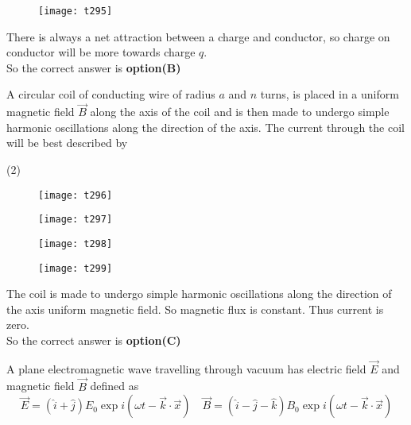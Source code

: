 \begin{questions}
\begin{tasks}
\begin{figure}[H]
	\end{figure}
	\task[\textbf{D.}] \begin{figure}[H]
		\centering
		\texttt{[image: t295]}
	\end{figure}
\end{tasks}
\begin{answer}
	There is always a net attraction between a charge and conductor, so charge on conductor will be more towards charge $q$.\\
	So the correct answer is \textbf{option(B)}
\end{answer}
\begin{minipage}{\textwidth}
	\question A circular coil of conducting wire of radius $a$ and $n$ turns, is placed in a uniform magnetic field $\vec{B}$ along the axis of the coil and is then made to undergo simple harmonic oscillations along the direction of the axis. The current through the coil will be best described by
\end{minipage}
\begin{tasks}(2)
	\task[\textbf{A.}] \begin{figure}[H]
		\centering
		\texttt{[image: t296]}
	\end{figure}
	\task[\textbf{B.}] \begin{figure}[H]
		\centering
		\texttt{[image: t297]}
	\end{figure}
	\task[\textbf{C.}] \begin{figure}[H]
		\centering
		\texttt{[image: t298]}
	\end{figure}
	\task[\textbf{D.}] \begin{figure}[H]
		\centering
		\texttt{[image: t299]}
	\end{figure}
\end{tasks}
\begin{answer}
The coil is made to undergo simple harmonic oscillations along the direction of the axis uniform magnetic field. So magnetic flux is constant. Thus current is zero.\\
	So the correct answer is \textbf{option(C)}
\end{answer}
\begin{minipage}{\textwidth}
	\question A plane electromagnetic wave travelling through vacuum has electric field $\vec{E}$ and magnetic field $\vec{B}$ defined as
	$$
	\vec{E}=(\hat{i}+\hat{j}) E_{0} \exp i(\omega t-\vec{k} \cdot \vec{x}) \quad \vec{B}=(\hat{i}-\hat{j}-\hat{k}) B_{0} \exp i(\omega t-\vec{k} \cdot \vec{x})
$$
\end{minipage}
\end{questions}

